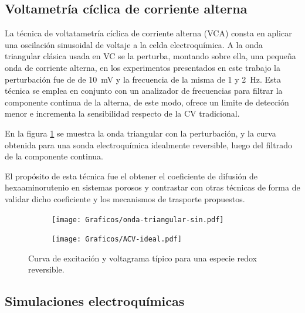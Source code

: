 	 		

	 \subsection{Voltametría cíclica de corriente alterna}

	 		La técnica de voltatametría cíclica de corriente alterna (VCA) consta en aplicar una oscilación sinusoidal de voltaje a la celda electroquímica. A la onda triangular clásica usada en VC se la perturba, montando sobre ella, una pequeña onda de corriente alterna, en los experimentos presentados en este trabajo la perturbación fue de de \SI{10}{\milli\volt} y la frecuencia de la misma de 1 y \SI{2}{\hertz}. Esta técnica se emplea en conjunto con un analizador de frecuencias para filtrar la componente continua de la alterna, de este modo, ofrece un limite de detección menor e incrementa la sensibilidad respecto de la CV tradicional.\cite{Wi2000,Skoog1995}

	 		En la figura \ref{fig:ACV_ideal} se muestra la onda triangular con la perturbación, y la curva obtenida para una sonda electroquímica idealmente reversible, luego del filtrado de la componente continua.

	 		El propósito de esta técnica fue el obtener el coeficiente de difusión de hexaaminorutenio en sistemas porosos y contrastar con otras técnicas de forma de validar dicho coeficiente y los mecanismos de trasporte propuestos. 

	 			 \begin{figure}[hb]
			  		  \begin{subfigure}[t]{0.495\textwidth}
			  		  \texttt{[image: Graficos/onda-triangular-sin.pdf]}
			  		  \end{subfigure}
			  		  \begin{subfigure}[t]{0.495\textwidth}
			  		  \texttt{[image: Graficos/ACV-ideal.pdf]}
			  		  \end{subfigure}
			  		  \caption[Voltamperometria ideal reversible]{Curva de excitación y voltagrama típico para una especie redox reversible.}
			  		  \label{fig:ACV_ideal}
			  		  \end{figure}
	 		
	 		
			
	 \subsection{Simulaciones electroquímicas}\label{simulacion}

